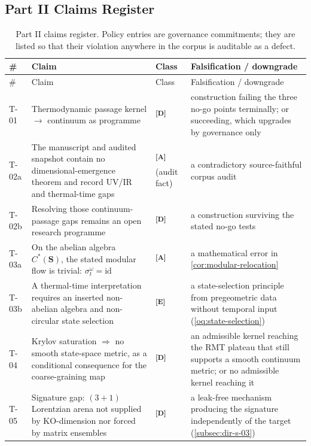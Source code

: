 \documentclass[12pt,a4paper,twoside]{article}
\theoremstyle{plain}
\theoremstyle{definition}
\theoremstyle{remark}
\newcommand{\catmark}[1]{\textsuperscript{\textsf{\textbf{[#1]}}}}
\begin{document}
\subsection{Part II Claims Register}
\label{subsec:part2-claims}

{\footnotesize
\begin{longtable}{@{}p{}p{}p{}p{}@{}}
\caption{Part II claims register. Policy entries are governance commitments; they are listed so that their violation anywhere in the corpus is auditable as a defect.}\label{tab:part2-claims}\\
\toprule
\# & Claim & Class & Falsification / downgrade \\
\midrule
\endfirsthead
\toprule
\# & Claim & Class & Falsification / downgrade \\
\midrule
\endhead
\bottomrule
\endfoot
T-01 & Thermodynamic passage kernel $\to$ continuum as programme &
\catmark{D} & construction failing the three no-go points terminally;
or succeeding, which upgrades by governance only \\
T-02a & The manuscript and audited snapshot contain no dimensional-emergence theorem and record UV/IR and thermal-time gaps & \catmark{A} (audit fact) & a contradictory source-faithful corpus audit \\
T-02b & Resolving those continuum-passage gaps remains an open research programme & \catmark{D} & a construction surviving the stated no-go tests \\
T-03a & On the abelian algebra $C^\ast(\mathbf S)$, the stated modular flow is trivial: $\sigma^\omega_t=\mathrm{id}$ & \catmark{A} & a mathematical error in \cref{cor:modular-relocation} \\
T-03b & A thermal-time interpretation requires an inserted non-abelian algebra and non-circular state selection & \catmark{E} & a state-selection principle from pregeometric data without temporal input (\cref{oq:state-selection}) \\
T-04 & Krylov saturation $\Rightarrow$ no smooth state-space metric, as a
conditional consequence for the coarse-graining map & \catmark{D} & an
admissible kernel reaching the RMT plateau that still supports a smooth
continuum metric; or no admissible kernel reaching it \\
T-05 & Signature gap: $(3{+}1)$ Lorentzian arena not supplied by
$\mathrm{KO}$-dimension nor forced by matrix ensembles & \catmark{D} &
a leak-free mechanism producing the signature independently of the target
(\cref{subsec:dir-s-03}) \\

\end{longtable}}
\end{document}
